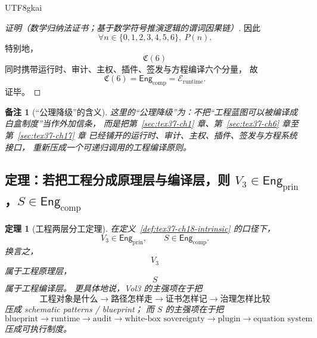 \documentclass[12pt]{article}
\newtheorem{theorem}{定理}[section]
\newtheorem{remark}{备注}[section]
\begin{document}
\begin{CJK*}{UTF8}{gkai}
\begin{proof}[证明（数学归纳法证书；基于数学符号推演逻辑的谓词因果链）]
因此
\[
  \forall n\in\{0,1,2,3,4,5,6\},\ P(n).
\]
特别地，
\[
  \mathfrak C(6)
\]
同时携带运行时、审计、主权、插件、签发与方程编译六个分量，
故
\[
  \mathfrak C(6)=\mathsf{Eng}_{\mathrm{comp}}=\mathcal{E}_{\mathrm{runtime}}.
\]
证毕。
\end{proof}

\begin{remark}[“公理降级”的含义]
\label{rem:tex37-ch18-downgrade}
这里的“公理降级”为：不把“工程蓝图可以被编译成白盒制度”当作外加信条，
而是把第~\ref{sec:tex37-ch1} 章、第~\ref{sec:tex37-ch6} 章至第~\ref{sec:tex37-ch17} 章
已经铺开的运行时、审计、主权、插件、签发与方程系统接口，
重新压成一个可递归调用的工程编译原则。
\end{remark}

\subsection[定理：工程两层分工]{定理：若把工程分成原理层与编译层，则 $V_3\in \mathsf{Eng}_{\mathrm{prin}}$，$S\in \mathsf{Eng}_{\mathrm{comp}}$}
\label{subsec:tex37-ch18-theorem}

\begin{theorem}[工程两层分工定理]
\label{thm:tex37-ch18-v3}
在定义~\ref{def:tex37-ch18-intrinsic} 的口径下，
\[
  V_3\in \mathsf{Eng}_{\mathrm{prin}},
  \qquad
  S\in \mathsf{Eng}_{\mathrm{comp}}.
\]
换言之，
\[
  V_3
\]
属于工程原理层，
\[
  S
\]
属于工程编译层。
更具体地说，Vol3 的主强项在于把
\[
  \text{工程对象是什么}
  \to
  \text{路径怎样走}
  \to
  \text{证书怎样记}
  \to
  \text{治理怎样比较}
\]
压成 schematic patterns / blueprint；
而 $S$ 的主强项在于把
\[
  \text{blueprint}
  \to
  \text{runtime}
  \to
  \text{audit}
  \to
  \text{white-box sovereignty}
  \to
  \text{plugin}
  \to
  \text{equation system}
\]
压成可执行制度。
\end{theorem}


\end{CJK*}
\end{document}
